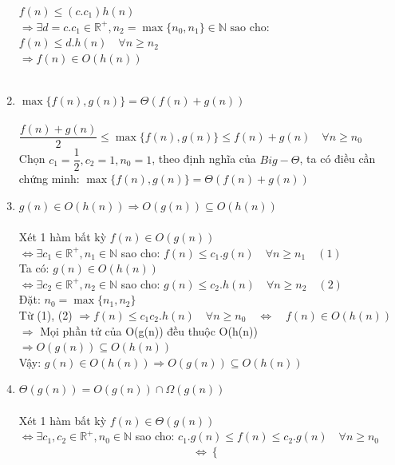 \documentclass[12pt, letterpaper]{article}
\begin{document}
\begin{enumerate}[label=\bfseries\large\alph*.]
     $f(n) \leq (c.c_1)h(n)$\\
    $\Rightarrow \exists d = c.c_1 \in \mathbb{R^+},n_2 = \max\{n_0, n_1\} \in \mathbb{N} \text{ sao cho:}$ \\
    $f(n) \leq d.h(n) \quad \forall n \geq n_2$ \\
    $\Rightarrow f(n) \in O(h(n))$\\
     \\
    \item $\max{\{f(n), g(n)\}} = \Theta(f(n)+g(n))$ \\\\
		$\dfrac{f(n) + g(n)}{2} \leq \max{\{f(n), g(n)\}} \leq f(n) + g(n) \quad\forall n \geq n_0$ \\
		Chọn $c_1 = \dfrac{1}{2}, c_2 = 1, n_0 = 1$, theo định nghĩa của $Big-\Theta$, ta có điều cần chứng minh: $\max{\{f(n), g(n)\}} = \Theta(f(n)+g(n))$
		\item $g(n) \in O(h(n)) \Rightarrow O(g(n)) \subseteq O(h(n))$ \\\\
		Xét 1 hàm bất kỳ $f(n) \in O(g(n))$ \\
		$\Leftrightarrow \exists c_1 \in \mathbb{R^+}, n_1 \in \mathbb{N}$ sao cho:
		$f(n) \leq c_1.g(n) \quad\forall n \geq n_1 \quad (1)$ \\
		Ta có: $g(n) \in O(h(n))$ \\
		$\Leftrightarrow \exists c_2 \in \mathbb{R^+}, n_2 \in \mathbb{N}$ sao cho:
		$g(n) \leq c_2.h(n) \quad\forall n \geq n_2 \quad (2)$ \\
		Đặt: $n_0 = \max{\{n_1, n_2\}}$ \\
		Từ (1), (2) $\Rightarrow f(n) \leq c_1c_2.h(n) \quad\forall n \geq n_0
		\quad \Leftrightarrow \quad f(n) \in O(h(n))$ \\
		$\Rightarrow$ Mọi phần tử của O(g(n)) đều thuộc O(h(n)) $\Rightarrow O(g(n)) \subseteq O(h(n))$ \\
		Vậy: $g(n) \in O(h(n)) \Rightarrow O(g(n)) \subseteq O(h(n))$
		\item $\Theta(g(n)) = O(g(n)) \cap \Omega(g(n))$ \\\\
		Xét 1 hàm bất kỳ $f(n) \in \Theta(g(n))$ \\
		$\Leftrightarrow \exists c_1, c_2 \in \mathbb{R^+}, n_0 \in \mathbb{N}$ sao cho: 
		$c_1.g(n) \leq f(n) \leq c_2.g(n) \quad\forall n \geq n_0$
		\begin{gather*}
			\Leftrightarrow\left\{\begin{array}{lll}

\end{array}
\end{gather*}
\end{enumerate}
\end{document}
